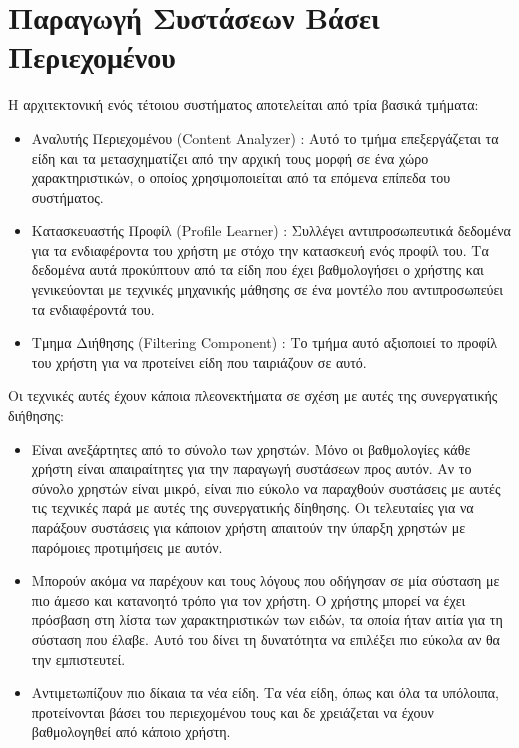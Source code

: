 \section{Παραγωγή Συστάσεων Βάσει Περιεχομένου}
Η αρχιτεκτονική ενός τέτοιου συστήματος αποτελείται από τρία βασικά τμήματα: 
 \begin{itemize}
 \item Αναλυτής Περιεχομένου ({\en Content Analyzer}) : Αυτό το τμήμα επεξεργάζεται τα είδη και τα μετασχηματίζει από την αρχική τους μορφή σε ένα χώρο χαρακτηριστικών, ο οποίος χρησιμοποιείται από τα επόμενα επίπεδα του συστήματος.
 \item Κατασκευαστής Προφίλ ({\en Profile Learner}) : Συλλέγει αντιπροσωπευτικά δεδομένα για τα ενδιαφέροντα του χρήστη με στόχο την κατασκευή ενός προφίλ του. Τα δεδομένα αυτά προκύπτουν από τα είδη που έχει βαθμολογήσει ο χρήστης και γενικεύονται με τεχνικές μηχανικής μάθησης σε ένα μοντέλο που αντιπροσωπεύει τα ενδιαφέροντά του. \cite{Mitchell:1997:ML:541177}
 \item Τμημα Διήθησης ({\en Filtering Component}) : Το τμήμα αυτό αξιοποιεί το προφίλ του χρήστη για να προτείνει είδη που ταιριάζουν σε αυτό.  
 \end{itemize}\par
Οι τεχνικές αυτές έχουν κάποια πλεονεκτήματα σε σχέση με αυτές της συνεργατικής διήθησης:
\begin{itemize}
\item Είναι ανεξάρτητες από το σύνολο των χρηστών. Μόνο οι βαθμολογίες κάθε χρήστη είναι απαιραίτητες για την παραγωγή συστάσεων προς αυτόν. Αν το σύνολο χρηστών είναι μικρό, είναι πιο εύκολο να παραχθούν συστάσεις με αυτές τις τεχνικές παρά με αυτές της συνεργατικής δίηθησης. Οι τελευταί\-ες για να παράξουν συστάσεις για κάποιον χρήστη απαιτούν την ύπαρξη χρηστών με παρόμοιες προτιμήσεις με αυτόν. 
\item Μπορούν ακόμα να παρέχουν και τους λόγους που οδήγησαν σε μία σύσταση με πιο άμεσο και κατανοητό τρόπο για τον χρήστη. Ο χρήστης μπορεί να έχει πρόσβαση στη λίστα των χαρακτηριστικών των ειδών, τα οποία ήταν αιτία για τη σύσταση που έλαβε. Αυτό του δίνει τη δυνατότητα να επιλέξει πιο εύκολα αν θα την εμπιστευτεί.
\item Αντιμετωπίζουν πιο δίκαια τα νέα είδη. Τα νέα είδη, όπως και όλα τα υπόλοιπα, προτείνονται βάσει του περιεχομένου τους και δε χρειάζεται να έχουν βαθμολογηθεί από κάποιο χρήστη.
\end{itemize}\par
